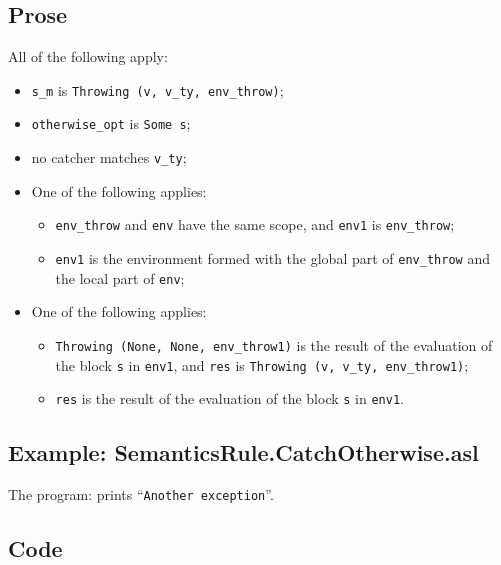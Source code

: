 \documentclass{book}
\begin{document}
    \subsection{Prose}
    All of the following apply:
    \begin{itemize}
    \item \texttt{s\_m} is \texttt{Throwing (v, v\_ty, env\_throw)};
    \item \texttt{otherwise\_opt} is \texttt{Some s};
    \item no catcher matches \texttt{v\_ty};
    \item One of the following applies:
      \begin{itemize}
      \item \texttt{env\_throw} and \texttt{env} have the same scope, and \texttt{env1} is \texttt{env\_throw};
      \item \texttt{env1} is the environment formed with the global part of \texttt{env\_throw}
        and the local part of \texttt{env};
      \end{itemize}
    \item One of the following applies:
      \begin{itemize}
      \item \texttt{Throwing (None, None, env\_throw1)} is the result of the evaluation of
        the block \texttt{s} in \texttt{env1}, and \texttt{res} is \texttt{Throwing (v, v\_ty, env\_throw1)};
      \item \texttt{res} is the result of the evaluation of the block \texttt{s} in \texttt{env1}.
      \end{itemize}
    \end{itemize}

    \subsection{Example: SemanticsRule.CatchOtherwise.asl}
     The program:
     prints ``\texttt{Another exception}''.

  \subsection{Code}
\end{document}
